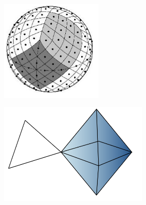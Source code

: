 \documentclass[landscape,a0paper,blockverticalspace = 5mm]{tikzposter}
\begin{document}
\begin{columns}
{{\begin{center}
\begin{minipage}{0.1\linewidth}
\begin{center}
		        
         \end{center}
      \end{minipage} \hspace{0cm}
	\begin{minipage}{0.2\linewidth}
	\begin{center}
          \includegraphics[height=5cm]{figures/sphere.png}
          
        
          \end{center}
      \end{minipage} 
   \begin{minipage}{0.1\linewidth}
      \begin{center}
      
		        
         \end{center}
      \end{minipage} \hspace{0cm}
	\begin{minipage}{0.2\linewidth}
	\begin{center}
          \includegraphics[height=5cm]{figures/high-order.png}
          

\end{center}
\end{minipage}
\end{center}}}
\end{columns}
\end{document}
